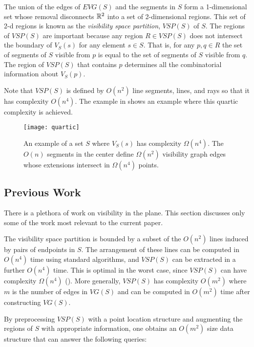 \documentclass{patmorin}
\newcommand{\VG}{\mathit{VG}}
\newcommand{\EVG}{\mathit{EVG}}
\newcommand{\VSP}{\mathit{VSP}}
\begin{document}
The union of the edges of $\EVG(S)$ and the segments in $S$ form a
1-dimensional set whose removal disconnects $\mathbb{R}^2$ into a set of
2-dimensional regions.  This set of 2-d regions is known as the
\emph{visibility space partition}, $\VSP(S)$ of $S$.  The regions
of $\VSP(S)$ are important because any region $R\in\VSP(S)$ does not
intersect the boundary of $V_S(s)$ for any element $s\in S$. That is,
for any $p,q\in R$ the set of segments of $S$ visible from $p$ is equal to
the set of segments of $S$ visible from $q$.  The region of $\VSP(S)$ that
contains $p$ determines all the combinatorial information about $V_S(p)$.

Note that $\VSP(S)$ is defined by $O(n^2)$ line segments, lines, and rays
so that it has complexity $O(n^4)$.  The example in  shows
an example where this quartic complexity is achieved.

\begin{figure}
  \begin{center}
    \texttt{[image: quartic]}
  \end{center}
  \caption{An example of a set $S$ where $V_S(s)$ has complexity
   $\Omega(n^4)$. The $O(n)$ segments in the center define $\Omega(n^2)$
   visibility graph edges whose extensions intersect in $\Omega(n^4)$ points.}
\end{figure}

\subsection{Previous Work}

There is a plethora of work on visibility in the plane.  This section
discusses only some of the work most relevant to the current paper.

The visibility space partition is bounded by a subset of the $O(n^2)$ lines
induced by pairs of endpoints in $S$. The arrangement of these lines can be
computed in $O(n^4)$ time using standard algorithms, and $\VSP(S)$ can be
extracted in a further $O(n^4)$ time.  This is optimal in the worst case,
since $\VSP(S)$ can have complexity $\Omega(n^4)$ \cite[Figure~8.13]{o87}
().  More generally, $\VSP(S)$ has complexity $O(m^2)$
where $m$ is the number of edges in $\VG(S)$ and can be computed in
$O(m^2)$ time after constructing $\VG(S)$.

By preprocessing $\VSP(S)$ with a point location structure and augmenting
the regions of $S$ with appropriate information, one obtains an $O(m^2)$
size data structure that can answer the following queries:
\end{document}
